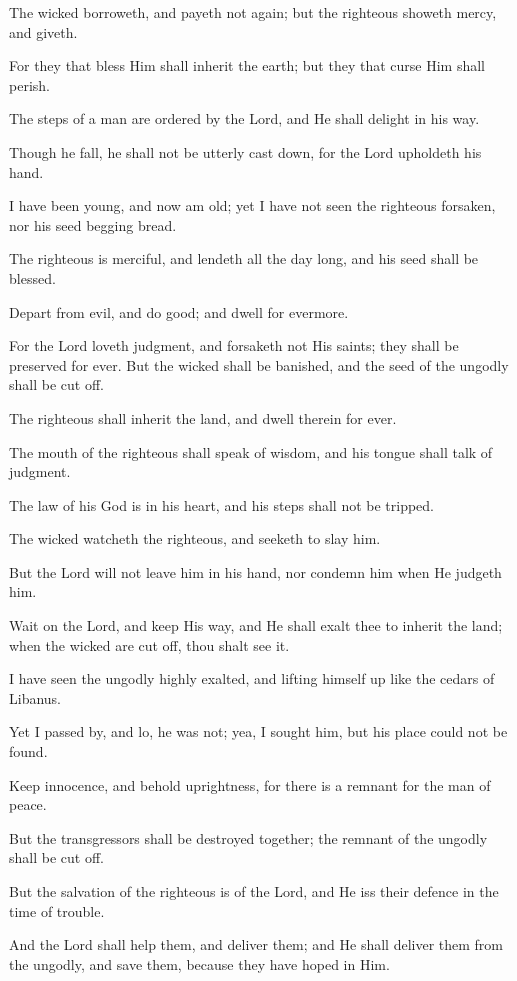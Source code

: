 The wicked borroweth, and payeth not again; but the righteous showeth mercy, and giveth.

For they that bless Him shall inherit the earth; but they that curse Him shall perish.

The steps of a man are ordered by the Lord, and He shall delight in his way.

Though he fall, he shall not be utterly cast down, for the Lord upholdeth his hand.

I have been young, and now am old; yet I have not seen the righteous forsaken, nor his seed begging bread.

The righteous is merciful, and lendeth all the day long, and his seed shall be blessed.

Depart from evil, and do good; and dwell for evermore.

For the Lord loveth judgment, and forsaketh not His saints; they shall be preserved for ever. But the wicked shall be banished, and the seed of the ungodly shall be cut off.

The righteous shall inherit the land, and dwell therein for ever.

The mouth of the righteous shall speak of wisdom, and his tongue shall talk of judgment.

The law of his God is in his heart, and his steps shall not be tripped.

The wicked watcheth the righteous, and seeketh to slay him.

But the Lord will not leave him in his hand, nor condemn him when He judgeth him.

Wait on the Lord, and keep His way, and He shall exalt thee to inherit the land; when the wicked are cut off, thou shalt see it.

I have seen the ungodly highly exalted, and lifting himself up like the cedars of Libanus.

Yet I passed by, and lo, he was not; yea, I sought him, but his place could not be found.

Keep innocence, and behold uprightness, for there is a remnant for the man of peace.

But the transgressors shall be destroyed together; the remnant of the ungodly shall be cut off.

But the salvation of the righteous is of the Lord, and He iss their defence in the time of trouble.

And the Lord shall help them, and deliver them; and He shall deliver them from the ungodly, and save them, because they have hoped in Him.
